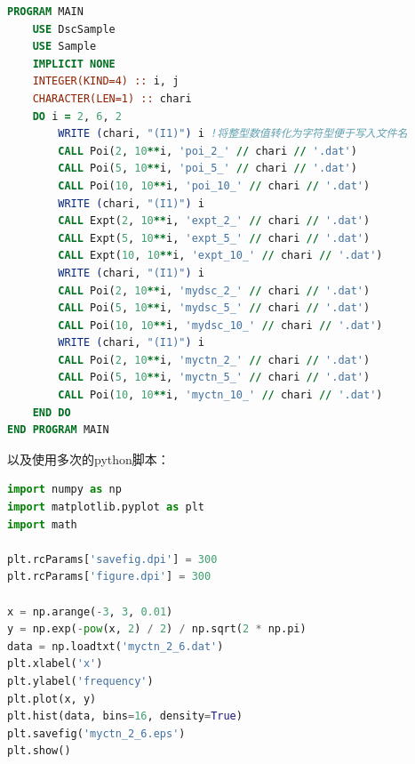 \documentclass[12pt,a4paper,utf8]{ctexart}
\begin{document}
\begin{framed}
\begin{lstlisting}[language=Fortran]
PROGRAM MAIN
    USE DscSample
    USE Sample
    IMPLICIT NONE
    INTEGER(KIND=4) :: i, j
    CHARACTER(LEN=1) :: chari 
    DO i = 2, 6, 2
        WRITE (chari, "(I1)") i !将整型数值转化为字符型便于写入文件名
        CALL Poi(2, 10**i, 'poi_2_' // chari // '.dat') 
        CALL Poi(5, 10**i, 'poi_5_' // chari // '.dat')
        CALL Poi(10, 10**i, 'poi_10_' // chari // '.dat')
        WRITE (chari, "(I1)") i
        CALL Expt(2, 10**i, 'expt_2_' // chari // '.dat') 
        CALL Expt(5, 10**i, 'expt_5_' // chari // '.dat')
        CALL Expt(10, 10**i, 'expt_10_' // chari // '.dat')
        WRITE (chari, "(I1)") i
        CALL Poi(2, 10**i, 'mydsc_2_' // chari // '.dat') 
        CALL Poi(5, 10**i, 'mydsc_5_' // chari // '.dat')
        CALL Poi(10, 10**i, 'mydsc_10_' // chari // '.dat')
        WRITE (chari, "(I1)") i
        CALL Poi(2, 10**i, 'myctn_2_' // chari // '.dat') 
        CALL Poi(5, 10**i, 'myctn_5_' // chari // '.dat')
        CALL Poi(10, 10**i, 'myctn_10_' // chari // '.dat')
    END DO
END PROGRAM MAIN

\end{lstlisting}
\end{framed}

以及使用多次的python脚本：
\begin{framed}
\begin{lstlisting}[language=python]
import numpy as np
import matplotlib.pyplot as plt
import math

plt.rcParams['savefig.dpi'] = 300
plt.rcParams['figure.dpi'] = 300

x = np.arange(-3, 3, 0.01)
y = np.exp(-pow(x, 2) / 2) / np.sqrt(2 * np.pi)
data = np.loadtxt('myctn_2_6.dat')
plt.xlabel('x')
plt.ylabel('frequency')
plt.plot(x, y)
plt.hist(data, bins=16, density=True)
plt.savefig('myctn_2_6.eps')
plt.show()
\end{lstlisting}
\end{framed}
\end{document}

